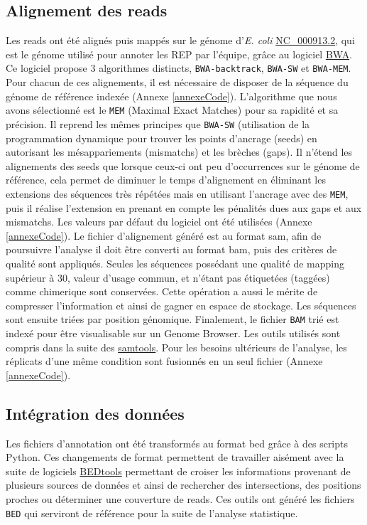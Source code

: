 \documentclass[12pt,a4paper]{report}
\begin{document}
\begin{onehalfspace}
\section*{Alignement des reads}
Les reads ont été alignés puis mappés sur le génome d'\textit{E. coli} \href{http://www.ncbi.nlm.nih.gov/nuccore/NC_000913.2}{NC\_000913.2}, qui est le génome utilisé pour annoter les REP par l'équipe, grâce au logiciel \href{http://bio-bwa.sourceforge.net/}{BWA}.  Ce logiciel propose 3 algorithmes distincts, \texttt{BWA-backtrack}, \texttt{BWA-SW} et \texttt{BWA-MEM}. Pour chacun de ces alignements, il est nécessaire de disposer de la séquence du génome de référence indexée (Annexe \ref{annexeCode}). 
L'algorithme que nous avons sélectionné est le \texttt{MEM} (Maximal Exact Matches) pour sa rapidité et sa précision. Il reprend les mêmes principes que \texttt{BWA-SW} (utilisation de la programmation dynamique pour trouver les points d'ancrage (seeds) en autorisant les mésappariements (mismatchs) et les brèches (gaps). Il n'étend les alignements des seeds que lorsque ceux-ci ont peu d'occurrences sur le génome de référence, cela permet de diminuer le temps d'alignement en éliminant les extensions des séquences très répétées mais en utilisant l'ancrage avec des \texttt{MEM}, puis il réalise l'extension en prenant en compte les pénalités dues aux gaps et aux mismatchs. Les valeurs par défaut du logiciel ont été utilisées (Annexe \ref{annexeCode}).
Le fichier d'alignement généré est au format \gls{sam}, afin de poursuivre l'analyse il doit être converti au format \gls{bam}, puis des critères de qualité sont appliqués. Seules les séquences possédant une qualité de mapping supérieur à 30, valeur d'usage commun, et n'étant pas étiquetées (taggées) comme \gls{chimerique} sont conservées. Cette opération a aussi le mérite de compresser l'information et ainsi de gagner en espace de stockage. Les séquences sont ensuite triées par position génomique. Finalement, le fichier \texttt{BAM} trié est indexé pour être visualisable sur un Genome Browser. Les outils utilisés sont compris dans la suite des \href{http://samtools.sourceforge.net/samtools.shtml}{samtools}. Pour les besoins ultérieurs de l'analyse, les réplicats d'une même condition sont fusionnés en un seul fichier (Annexe \ref{annexeCode}).

\subsection*{Intégration des données}
Les fichiers d'annotation ont été transformés au format \gls{bed} grâce à des scripts Python.
Ces changements de format permettent de travailler aisément avec la suite de logiciels \href{http://bedtools.readthedocs.org/en/latest/}{BEDtools} permettant de croiser les informations provenant de plusieurs sources de données et ainsi de rechercher des intersections, des positions proches ou déterminer une \gls{couverture} de reads. Ces outils ont généré les fichiers \texttt{BED} qui serviront de référence pour la suite de l'analyse statistique.


\end{onehalfspace}
\end{document}

